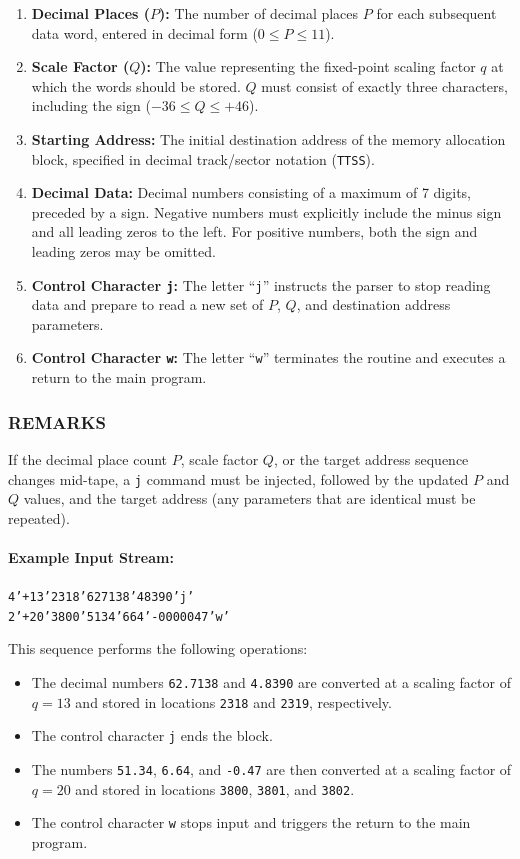 \begin{enumerate}
    \item \textbf{Decimal Places ($P$):} The number of decimal places $P$ for each subsequent data word, entered in decimal form ($0 \le P \le 11$).
    \item \textbf{Scale Factor ($Q$):} The value representing the fixed-point scaling factor $q$ at which the words should be stored. $Q$ must consist of exactly three characters, including the sign ($-36 \le Q \le +46$).
    \item \textbf{Starting Address:} The initial destination address of the memory allocation block, specified in decimal track/sector notation (\texttt{TTSS}).
    \item \textbf{Decimal Data:} Decimal numbers consisting of a maximum of 7 digits, preceded by a sign. Negative numbers must explicitly include the minus sign and all leading zeros to the left. For positive numbers, both the sign and leading zeros may be omitted.
    \item \textbf{Control Character \texttt{j}:} The letter ``\texttt{j}'' instructs the parser to stop reading data and prepare to read a new set of $P$, $Q$, and destination address parameters.
    \item \textbf{Control Character \texttt{w}:} The letter ``\texttt{w}'' terminates the routine and executes a return to the main program.
\end{enumerate}

\subsubsection*{REMARKS}
If the decimal place count $P$, scale factor $Q$, or the target address sequence changes mid-tape, a \texttt{j} command must be injected, followed by the updated $P$ and $Q$ values, and the target address (any parameters that are identical must be repeated).

\paragraph{Example Input Stream:}
\begin{center}
\texttt{4'+13'2318'627138'48390'j'} \\
\texttt{2'+20'3800'5134'664'-0000047'w'}
\end{center}

\noindent This sequence performs the following operations:
\begin{itemize}
    \item The decimal numbers \texttt{62.7138} and \texttt{4.8390} are converted at a scaling factor of $q = 13$ and stored in locations \texttt{2318} and \texttt{2319}, respectively.
    \item The control character \texttt{j} ends the block. 
    \item The numbers \texttt{51.34}, \texttt{6.64}, and \texttt{-0.47} are then converted at a scaling factor of $q = 20$ and stored in locations \texttt{3800}, \texttt{3801}, and \texttt{3802}. 
    \item The control character \texttt{w} stops input and triggers the return to the main program.
\end{itemize}

